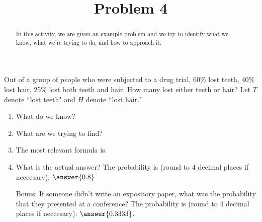 \documentclass{ximera}
\title{Problem 4}
\begin{document}
      
\begin{abstract}
      
In this activity, we are given an example problem and we try to identify what we know, what we're trying to do, and how to approach it.
      
\end{abstract}
      
\maketitle
      
 
Out of a group of people who were subjected to a drug trial, 60\% lost teeth, 40\% lost hair, 25\% lost both teeth and hair.  How many lost either teeth or hair?  Let $T$ denote ``lost teeth" and $H$ denote ``lost hair."

 
 \begin{enumerate}
\item What do we know?

\begin{selectAll}
\end{selectAll}

\item What are we trying to find?

\begin{multipleChoice}




\end{multipleChoice}

\item The most relevant formula is:

\begin{multipleChoice}
\end{multipleChoice}

\item What is the actual answer?  The probability is (round to 4 decimal places if neccesary): $\answer{0.8}$

\item[Bonus:] If someone didn't write an expository paper, what was the probability that they presented at a conference?  The probability is (round to 4 decimal places if neccesary): $\answer{0.3333}$.

\end{enumerate}

 
 
 
 
      
\end{document}
